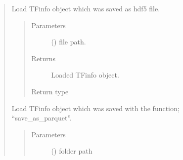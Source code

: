 \documentclass[letterpaper,10pt,english]{sphinxmanual}
\begin{document}
\begin{quote}
\begin{fulllineitems}
\begin{quote}
\begin{description}
\end{description}\end{quote}

\end{fulllineitems}


\begin{fulllineitems}
\label{\detokenize{modules/celloracle.motif_analysis:celloracle.motif_analysis.load_TFinfo}}
Load TFinfo object which was saved as hdf5 file.
\begin{quote}\begin{description}
\item[{Parameters}] \leavevmode
{} () \textendash{} file path.

\item[{Returns}] \leavevmode
Loaded TFinfo object.

\item[{Return type}] \leavevmode
{\hyperref[\detokenize{modules/celloracle.motif_analysis:celloracle.motif_analysis.TFinfo}]{}}

\end{description}\end{quote}

\end{fulllineitems}


\begin{fulllineitems}
\label{\detokenize{modules/celloracle.motif_analysis:celloracle.motif_analysis.load_TFinfo_from_parquets}}
Load TFinfo object which was saved with the function; “save\_as\_parquet”.
\begin{quote}\begin{description}
\item[{Parameters}] \leavevmode
{} () \textendash{} folder path


\end{description}
\end{quote}
\end{fulllineitems}
\end{quote}
\end{document}
